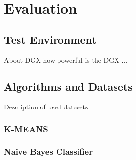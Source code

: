\chapter{Evaluation}
\label{chap:07_evaluation}
%

\section{Test Environment}
About DGX how powerful is the DGX ...

\section{Algorithms and Datasets}
Description of used datasets


\subsection{K-MEANS}


\subsection{Naive Bayes Classifier}

